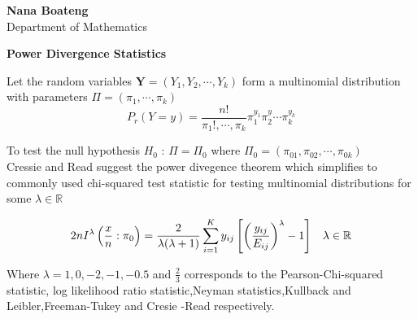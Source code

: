\documentclass{article}\usepackage[]{graphicx}\usepackage[]{color}
\numberwithin{equation}{subsection} %
\begin{document}
\begin{center}
{\Large {\bf Nana Boateng}} \\
\vspace{5mm}
{\Large Department of Mathematics} \\
\vspace{5mm}
\vspace{5mm}
\end{center}
\textbf{Power Divergence Statistics}

Let the random variables $\textbf{Y}=(Y_{1},Y_{2},\cdots,Y_{k})$ form a multinomial distribution with parameters      $\Pi=(\pi_{1},\cdots,\pi_{k})$\\
\begin{equation*}
P_{r}(Y=y)=\frac{n!}{\pi_{1}!,\cdots,\pi_{k}}\pi_{1}^{y_{1}}\pi_{2}^{y_{}}\cdots \pi_{k}^{y_{k}}
\end{equation*}

To test the null hypothesis $H_{0}$ :  $ \Pi=\Pi_{0}$ \hspace{5mm}where\hspace{2mm} $\Pi_{0}=(\pi_{01},\pi_{02},\cdots,\pi_{0k})$\\
Cressie and Read \cite{cressie1984} suggest the power divegence theorem which simplifies to commonly used chi-squared test statistic for testing multinomial distributions  for some $\lambda \in \mathbb{R}$




\begin{equation*}
2nI^{\lambda}\left(\frac{x}{n}:\pi_{0} \right)=\frac{2}{\lambda(\lambda+1)}\sum\limits_{i=1}^{K}y_{ij}\left[\left(\frac{y_{ij}}{E_{ij}}\right)^{\lambda}-1\right]\hspace{3mm}\lambda \in \mathbb{R}
\end{equation*}

Where $\lambda=1,0,-2,-1,-0.5$ and $\frac{2}{3}$ corresponds to the Pearson-Chi-squared statistic, log likelihood ratio statistic,Neyman statistics,Kullback and Leibler,Freeman-Tukey and Cresie -Read respectively.\\
\end{document}
